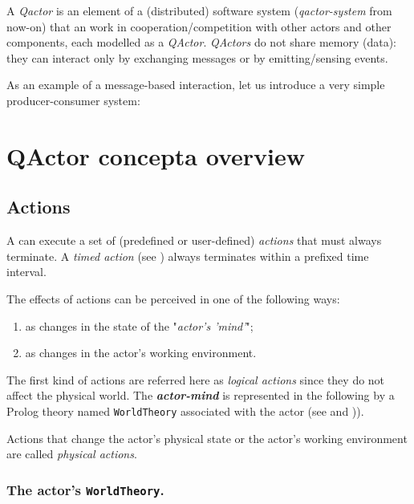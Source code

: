 A \textit{Qactor} is an element of a (distributed) software system (\textit{qactor-system} from now-on) that an work in cooperation/competition with other actors and other components, each modelled as a \textit{QActor}. \textit{QActors} do not share memory (data): they can interact only by exchanging messages or by emitting/sensing events.

As an example of a message-based interaction, let us introduce a very simple producer-consumer system:



\newpage 
\section{QActor concepta overview}


\subsection{Actions }
A \qa{} can execute a set of (predefined or user-defined) \textit{actions} that must always terminate.
A \textit{timed action} (see ) always terminates within a prefixed time interval.

The effects of actions can be perceived in one of the following ways:

\begin{enumerate}
 \item  as changes in the state of the "\textit{actor's 'mind'}";
 \item  as changes in the actor's working environment.
\end{enumerate}  

The first kind of actions are referred here as \textit{logical actions} since they do not affect the physical world.
The \textit{\textbf{actor-mind}} is represented in the following by a Prolog theory named \texttt{WorldTheory} associated with the actor (see  and )). 

Actions that change the actor's physical state or the actor's working environment are called \textit{physical actions}.
 


\subsubsection{The actor's  \texttt{WorldTheory}.}

